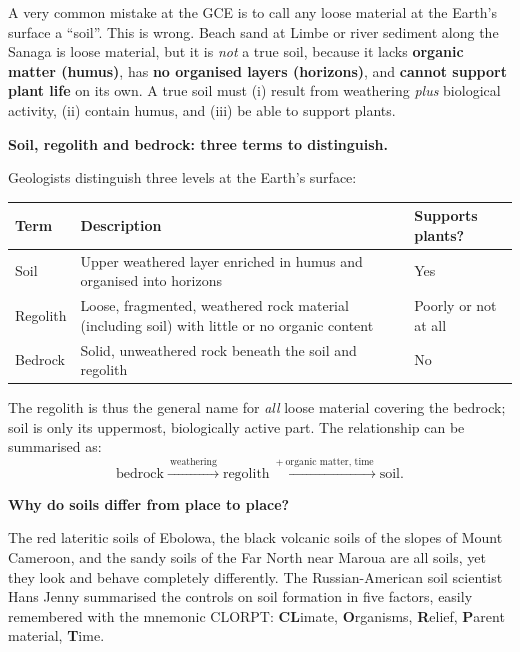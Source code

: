 \documentclass[11pt]{article}
\newcommand{\cle}[1]{{\popxbold\color{popdark}#1}}
\newcounter{popsec}
\newcounter{popsub}
\newcommand{\courssub}[1]{%
  \stepcounter{popsub}%
  \par\vspace{9pt}\noindent{\popxbold\fontsize{11.5}{13}\selectfont\color{popink}{\color{poporange}\thepopsec.\thepopsub}\hspace{6pt}#1}\par\nopagebreak\vspace{4pt}
}
\begin{document}
\begin{attention}
A very common mistake at the GCE is to call any loose material at the Earth's surface a ``soil''. This is wrong. Beach sand at Limbe or river sediment along the Sanaga is loose material, but it is \emph{not} a true soil, because it lacks \textbf{organic matter (humus)}, has \textbf{no organised layers (horizons)}, and \textbf{cannot support plant life} on its own. A true soil must (i) result from weathering \emph{plus} biological activity, (ii) contain humus, and (iii) be able to support plants.
\end{attention}

\textbf{Soil, regolith and bedrock: three terms to distinguish.}\par
Geologists distinguish three levels at the Earth's surface:

\begin{center}
\begin{tabularx}{\linewidth}{|l|X|X|}
\hline
\rowcolor{popblueL} \textbf{Term} & \textbf{Description} & \textbf{Supports plants?} \\
\hline
Soil & Upper weathered layer enriched in humus and organised into horizons & Yes \\
\hline
Regolith & Loose, fragmented, weathered rock material (including soil) with little or no organic content & Poorly or not at all \\
\hline
Bedrock & Solid, unweathered rock beneath the soil and regolith & No \\
\hline
\end{tabularx}
\end{center}

The \cle{regolith} is thus the general name for \emph{all} loose material covering the bedrock; soil is only its uppermost, biologically active part. The relationship can be summarised as:
\[
\text{bedrock} \xrightarrow{\ \text{weathering}\ } \text{regolith} \xrightarrow{\ +\ \text{organic matter, time}\ } \text{soil}.
\]

\courssub{The Five Soil-Forming Factors}

\textbf{Why do soils differ from place to place?}\par
The red lateritic soils of Ebolowa, the black volcanic soils of the slopes of Mount Cameroon, and the sandy soils of the Far North near Maroua are all soils, yet they look and behave completely differently. The Russian-American soil scientist Hans Jenny summarised the controls on soil formation in five factors, easily remembered with the mnemonic \cle{CLORPT}: \textbf{CL}imate, \textbf{O}rganisms, \textbf{R}elief, \textbf{P}arent material, \textbf{T}ime.
\end{document}
